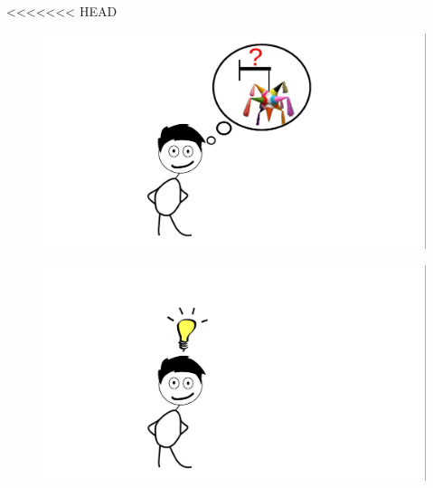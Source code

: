 <<<<<<< HEAD

\begin{frame}
\begin{figure}

\vspace{-.7cm}	
\hspace{-2cm}		\includegraphics[width=1.2\linewidth]{Pictures/animations/animation_1_1.png}
		\end{figure}

\end{frame}

\begin{frame}
\begin{figure}

\vspace{-.7cm}	
\hspace{-2cm}		\includegraphics[width=1.2\linewidth]{Pictures/animations/animation_2_2.png}
		\end{figure}

\end{frame}

